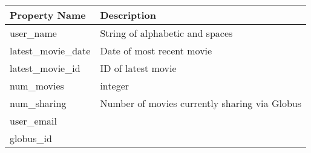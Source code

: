\begin{tabular}{p{4cm}p{6cm}}
\toprule
 Property Name     & Description                                   \\
\midrule
 user\_name         & String of alphabetic and spaces               \\
 latest\_movie\_date & Date of most recent movie                     \\
 latest\_movie\_id   & ID of latest movie                            \\
 num\_movies        & integer                                       \\
 num\_sharing       & Number of movies currently sharing via Globus \\
 user\_email        &                                               \\
 globus\_id         &                                               \\
\bottomrule
\end{tabular}